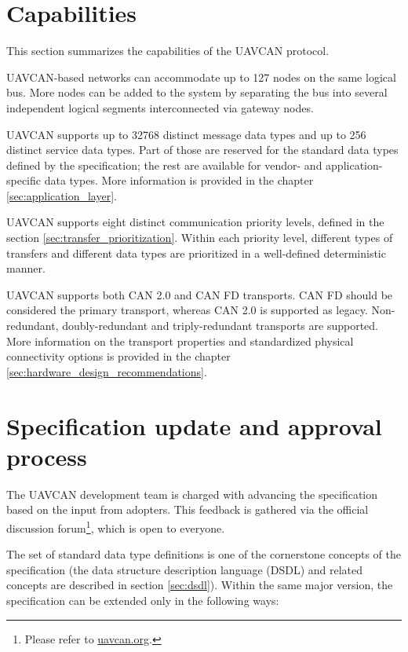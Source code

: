 \section{Capabilities}

This section summarizes the capabilities of the UAVCAN protocol.

UAVCAN-based networks can accommodate up to 127 nodes on the same logical bus.
More nodes can be added to the system by separating the bus into several independent logical segments
interconnected via gateway nodes.

UAVCAN supports up to 32768 distinct message data types and up to 256 distinct service data types.
Part of those are reserved for the standard data types defined by the specification;
the rest are available for vendor- and application-specific data types.
More information is provided in the chapter \ref{sec:application_layer}.

UAVCAN supports eight distinct communication priority levels,
defined in the section \ref{sec:transfer_prioritization}.
Within each priority level, different types of transfers and different data types are
prioritized in a well-defined deterministic manner.

UAVCAN supports both CAN 2.0 and CAN FD transports.
CAN FD should be considered the primary transport, whereas CAN 2.0 is supported as legacy.
Non-redundant, doubly-redundant and triply-redundant transports are supported.
More information on the transport properties and standardized physical connectivity options
is provided in the chapter \ref{sec:hardware_design_recommendations}.

\section{Specification update and approval process}

The UAVCAN development team is charged with advancing the specification based on the input from adopters.
This feedback is gathered via the official discussion
forum\footnote{Please refer to \href{http://uavcan.org}{uavcan.org}.},
which is open to everyone.

The set of standard data type definitions is one of the cornerstone concepts of the specification
(the data structure description language (DSDL) and related concepts are described in section \ref{sec:dsdl}).
Within the same major version, the specification can be extended only in the following ways:

